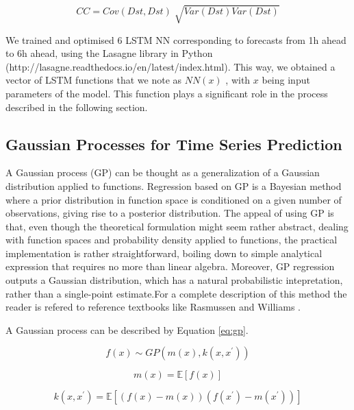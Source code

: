 \begin{equation}\label{eq:cc}
 CC=Cov \left( Dst,Dst \right) \sqrt[]{Var \left( Dst \right) Var \left( Dst \right) }
\end{equation}


We trained and optimised 6 LSTM NN corresponding to forecasts from 1h ahead to 6h ahead, using the 
Lasagne library in Python (http://lasagne.readthedocs.io/en/latest/index.html). This way, we obtained a 
vector of LSTM functions that we note as  \( NN \left( x \right)  \) , with  \( x \)  being input parameters 
of the model. This function plays a significant role in the process described in the following section. 


\subsection{Gaussian Processes for Time Series Prediction}

 A Gaussian process (GP) can be thought as a generalization of a Gaussian distribution applied to functions. 
 Regression based on GP is a Bayesian method where a prior distribution in function space is conditioned on a 
 given number of observations, giving rise to a posterior distribution. The appeal of using GP is that, even 
 though the theoretical formulation might seem rather abstract, dealing with function spaces and probability 
 density applied to functions, the practical implementation is rather straightforward, boiling down to simple 
 analytical expression that requires no more than linear algebra. Moreover, GP regression outputs a Gaussian 
 distribution, which has a natural probabilistic intepretation, rather than a single-point estimate.For a complete 
 description of this method the reader is refered to reference textbooks like Rasmussen and Williams 
 \cite{Rasmussen:2005:GPM:1162254}. 

A Gaussian process can be described by Equation \ref{eq:gp}. 

\begin{equation}\label{eq:gp}
 f \left( x \right)  \sim  GP \left( m \left( x \right) , k \left( x,x^{'} \right)  \right) 
\end{equation}

\begin{equation}\label{eq:meanfunc}
 m \left( x \right) = \mathbb{E} \left[ f \left( x \right)  \right]
\end{equation}

\begin{equation}\label{eq:kernelfunc}
 k ( x,x^{'}) = \mathbb{E} \left[  \left( f \left( x \right) -m \left( x \right)  \right)  ( f ( x^{'} ) -m ( x^{'}) )  \right]
\end{equation}


